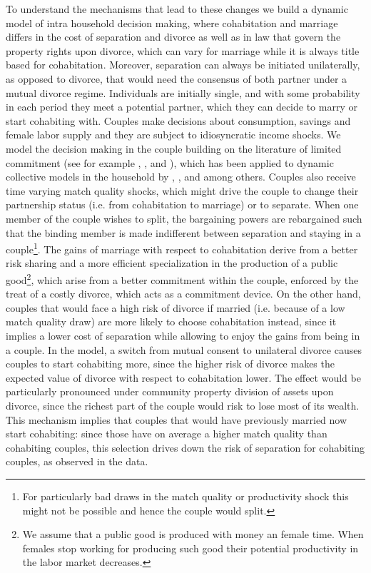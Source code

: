 \documentclass[12pt]{article}
\numberwithin{table}{section}
\begin{document}
To understand the mechanisms that lead to these changes we build a dynamic model of intra household decision making, where cohabitation and marriage differs in the cost of separation and divorce as well as in law that govern the property rights upon divorce, which can vary for marriage while it is always title based for cohabitation. Moreover, separation can always be initiated unilaterally, as opposed to divorce, that would need the consensus of both partner under a mutual divorce regime. Individuals are initially single, and with some probability in each period they meet a potential partner, which they can decide to marry or start cohabiting with. Couples make decisions about consumption, savings and female labor supply and they are subject to idiosyncratic income shocks.  We model the decision making in the couple building on the literature of limited commitment (see for example \cite{kk1996},  \cite{ligon2002}, \cite{marcet2019} and \cite{pavoni2018}), which has been applied to dynamic collective models in the household by \cite{voena2015}, \cite{mazzocco2007}, \cite{foerster2019} and \cite{lise2018} among others. Couples also receive time varying match quality shocks, which might drive the couple to change their partnership status (i.e. from cohabitation to marriage) or to separate. When one member of the couple wishes to split, the bargaining powers are rebargained such that the binding member is made indifferent between separation and staying in a couple\footnote{For particularly bad draws in the match quality or productivity shock this might not be possible and hence the couple would split.}. The gains of marriage with respect to cohabitation derive from a better risk sharing and a more efficient specialization in the production of a public good\footnote{We assume that a public good is produced with money an female time. When females stop working for producing such good their potential productivity in the labor market decreases.}, which arise from a better commitment within the couple, enforced by the treat of a costly divorce, which acts as a commitment device. On the other hand, couples that would face a high risk of divorce if married (i.e. because of a low match quality draw) are more likely to choose cohabitation instead, since it implies a lower cost of separation while allowing to enjoy the gains from being in a couple. In the model, a switch from mutual consent to unilateral divorce causes couples to start cohabiting more, since the higher risk of divorce makes the expected value of divorce with respect to cohabitation lower. The effect would be particularly pronounced under community property division of assets upon divorce, since the richest part of the couple  would risk to lose most of its wealth. This mechanism implies that couples that would have previously married now start cohabiting: since those have on average a higher match quality than cohabiting couples, this selection drives down the risk of separation for cohabiting couples, as observed in the data.
\end{document}
